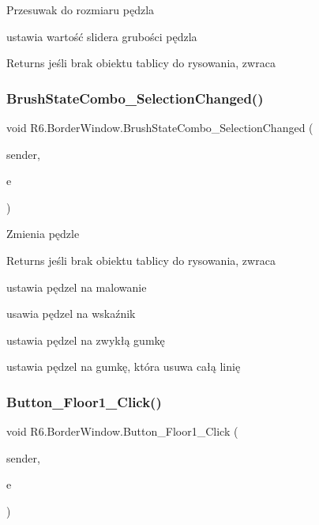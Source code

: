 Przesuwak do rozmiaru pędzla 

ustawia wartość slidera grubości pędzla \begin{DoxyReturn}{Returns}
jeśli brak obiektu tablicy do rysowania, zwraca 
\end{DoxyReturn}
\mbox{\label{class_r6_1_1_border_window_ac90a822259767b24cb4510075be87c59}} 
\subsubsection{\texorpdfstring{BrushStateCombo\_SelectionChanged()}{BrushStateCombo\_SelectionChanged()}}
{\footnotesize\ttfamily void R6.\+Border\+Window.\+Brush\+State\+Combo\+\_\+\+Selection\+Changed (\begin{DoxyParamCaption}\item[{object}]{sender,  }\item[{Selection\+Changed\+Event\+Args}]{e }\end{DoxyParamCaption})\hspace{0.3cm}{\ttfamily [private]}}



Zmienia pędzle 

\begin{DoxyReturn}{Returns}
jeśli brak obiektu tablicy do rysowania, zwraca 
\end{DoxyReturn}


ustawia pędzel na malowanie 

usawia pędzel na wskaźnik 

ustawia pędzel na zwykłą gumkę 

ustawia pędzel na gumkę, która usuwa całą linię \mbox{\label{class_r6_1_1_border_window_a3b311ca9574273854d443a4db07b3af3}} 
\subsubsection{\texorpdfstring{Button\_Floor1\_Click()}{Button\_Floor1\_Click()}}
{\footnotesize\ttfamily void R6.\+Border\+Window.\+Button\+\_\+\+Floor1\+\_\+\+Click (\begin{DoxyParamCaption}\item[{object}]{sender,  }\item[{Routed\+Event\+Args}]{e }\end{DoxyParamCaption})\hspace{0.3cm}{\ttfamily [private]}}



